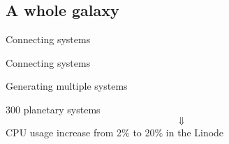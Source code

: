 \documentclass{beamer}
\begin{document}
\subsection{A whole galaxy}
\begin{frame}{Connecting systems}
\begin{center}
\noindent{}
\end{center}
\end{frame}
\begin{frame}{Connecting systems}
\begin{center}
\noindent{}
\end{center}
\end{frame}
\begin{frame}{Generating multiple systems}
\begin{center}
300 planetary systems
      $$\Downarrow$$
      CPU usage increase from 2\% to 20\% in the Linode
\end{center}
\end{frame}
\end{document}
